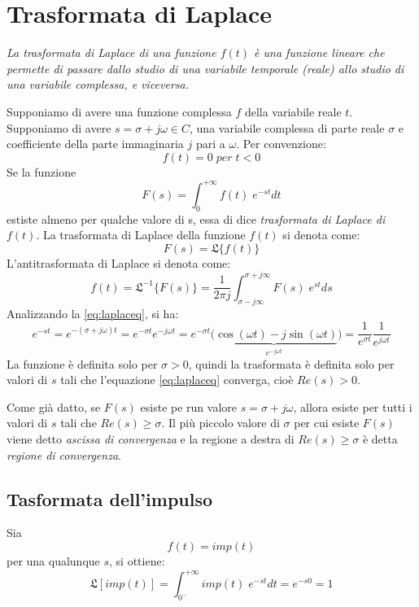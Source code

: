 \documentclass[a4paper]{report}
\begin{document}
\chapter{Trasformata di Laplace}\label{apx:laplace}
{\em La trasformata di Laplace di una funzione $f(t)$ \`e una funzione
lineare che permette di passare dallo studio di una variabile
temporale (reale) allo studio di una variabile complessa, e
viceversa.}

Supponiamo di avere una funzione complessa $f$ della variabile reale
$t$. Supponiamo di avere $s = \sigma + j \omega \in C$, una variabile
complessa di parte reale $\sigma$ e coefficiente della parte
immaginaria $j$ pari a $\omega$. Per convenzione:
\[
f(t) = 0 \;per\; t < 0
\]
Se la funzione
\begin{equation}\label{eq:laplaceq}
  F(s) = \int_{0}^{+\infty}f(t)\; e^{-st} dt
\end{equation}
estiste almeno per qualche valore di s, essa di dice {\em trasformata
  di Laplace di $f(t)$}.
La trasformata di Laplace della funzione $f(t)$ si denota come: 
\[
F(s) = \mathfrak{L}\{f(t)\}
\]
L'antitrasformata di Laplace si
denota come: 
\[
f(t)=\mathfrak{L^{-1}}\{F(s)\} = \dfrac{1}{2 \pi j} \int_{\sigma - j
  \infty}^{\sigma + j \infty} F(s)\; e^{st} ds
\]
Analizzando la \ref{eq:laplaceq}, si ha:
\begin{displaymath}
  e^{-st} = e^{-(\sigma + j \omega)t} = e^{-\sigma t}e^{-j\omega t} =
  e^{-\sigma t}\underbrace{(\cos(\omega t)-j \sin(\omega
    t)}_{e^{-j\omega t}}) = \frac{1}{e^{\sigma t}}\frac{1}{e^{j \omega t}} 
\end{displaymath}
La funzione \`e definita solo per $\sigma > 0$, quindi la trasformata
\`e definita solo per valori di $s$ tali che l'equazione
\ref{eq:laplaceq} converga, cio\`e $Re(s) > 0$.

Come gi\`a datto, se $F(s)$ esiste pe run valore $s = \sigma + j
\omega$, allora esiste per tutti i valori di $s$ tali che $Re(s)
\geq \sigma$. Il pi\`u piccolo valore di $\sigma$ per cui esiste
$F(s)$ viene detto {\em ascissa di convergenza} e la regione a destra di $Re(s) \geq \sigma$ \`e detta
{\em regione di convergenza}.

\section{Tasformata dell'impulso}
Sia
\[
f(t) = imp(t)
\]
per una qualunque $s$, si ottiene:
\begin{equation}
  \mathfrak{L}[imp(t)] = \int_{0^-}^{+\infty} imp(t)\; e^{-st} dt =
  e^{-s0} = 1
\end{equation}
\end{document}
